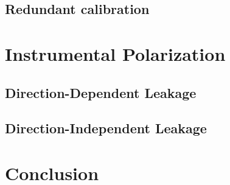 \subsection{Redundant calibration}

\section{Instrumental Polarization}
\label{sec:interferometry_pol}


\subsection{Direction-Dependent Leakage}


\subsection{Direction-Independent Leakage}

\section{Conclusion}
